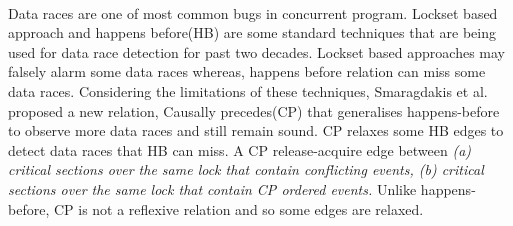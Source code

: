 \documentclass[12pt]{extarticle}
\begin{document}
\paragraph{}
Data races are one of most common bugs in concurrent program. Lockset based approach and happens before(HB) are some standard techniques that are being used for data race detection for past two decades. Lockset based approaches may falsely alarm some data races whereas, happens before relation can miss some data races. Considering the limitations of these techniques, Smaragdakis et al. proposed a new relation, Causally precedes(CP)\cite{smaragdakis2012sound} that generalises happens-before to observe more data races and still remain sound. CP relaxes some HB edges to detect data races that HB can miss. A CP release-acquire edge between \textit{(a) critical sections over the same lock that contain conflicting events, (b) critical sections over the same lock that contain CP ordered events.} Unlike happens-before, CP is not a reflexive relation and so some edges are relaxed. 


{\footnotesize
}

%
%
\end{document}
